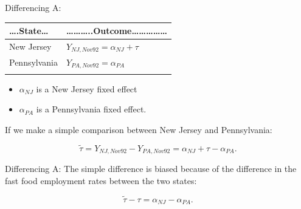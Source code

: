 \documentclass[
  ignorenonframetext,
]{beamer}
\begin{document}
\begin{frame}{Differencing A:}
\protect\hypertarget{differencing-a}{}
\begin{longtable}[]{@{}ll@{}}
\toprule\noalign{}
\ldots.State\ldots{} &
\ldots\ldots\ldots..Outcome\ldots\ldots\ldots\ldots\ldots{} \\
\midrule\noalign{}
\endhead
New Jersey & \(Y_{NJ,Nov92}=\alpha_{NJ}+\tau\) \\
Pennsylvania & \(Y_{PA,Nov92}=\alpha_{PA}\) \\
\bottomrule\noalign{}
\end{longtable}

\begin{itemize}
\item
  \(\alpha_{NJ}\) is a New Jersey fixed effect
\item
  \(\alpha_{PA}\) is a Pennsylvania fixed effect.
\end{itemize}

If we make a simple comparison between New Jersey and Pennsylvania:

\[
\tilde{\tau}=Y_{NJ,Nov92}-Y_{PA,Nov92}=\alpha_{NJ}+\tau-\alpha_{PA}.
\]
\end{frame}

\begin{frame}{Differencing A:}
\protect\hypertarget{differencing-a-1}{}
The simple difference is biased because of the difference in the fast
food employment rates between the two states:

\[
\tilde{\tau}-\tau=\alpha_{NJ}-\alpha_{PA}. 
\]
\end{frame}
\end{document}
